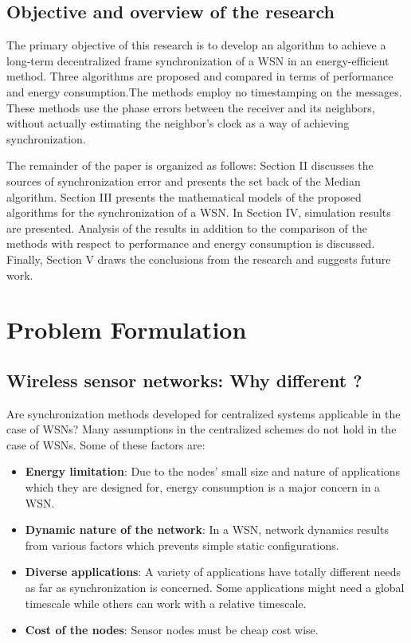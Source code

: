\documentclass[journal]{IEEEtran}
\begin{document}
\subsection{\textbf{Objective and overview of the research}}
The primary objective of this research is to develop an algorithm to
achieve a long-term decentralized frame synchronization of a WSN in
an energy-efficient method. Three algorithms are proposed and compared in terms of performance and
energy consumption.The methods employ no timestamping on the
messages. These methods use the phase errors between the receiver and
its neighbors, without actually estimating the neighbor's clock as a
way of achieving synchronization.
\par The remainder of the paper is organized as follows:
Section II discusses the sources of synchronization error and presents the set back of the Median algorithm.
Section III presents the mathematical models of the proposed algorithms for the synchronization of a WSN.
In Section IV, simulation results are presented. Analysis of the results in addition to the comparison of the methods with respect to performance and energy consumption is discussed. Finally, Section V draws the conclusions from the research and suggests future work.
\section{\textbf{Problem Formulation}}
\subsection{\textbf{Wireless sensor networks: Why different ?}}
 Are synchronization methods developed for centralized systems applicable in the case of WSNs? Many
assumptions in the centralized schemes do not hold in the case
of WSNs. Some of these factors are:
\begin{itemize}
\item \textbf{Energy limitation}: Due to the nodes' small size and nature of applications which they
are designed for, energy consumption is a major concern in a WSN.
\item \textbf{Dynamic nature of the network}: In a WSN, network
dynamics results from various factors which prevents simple
static configurations.
\item \textbf{Diverse applications}: A variety of applications
have totally different needs as far as synchronization is concerned.
Some applications might need a global timescale while
others can work with a relative timescale.
\item \textbf{Cost of the nodes}: Sensor nodes must be cheap cost wise.
\end{itemize}
\end{document}
